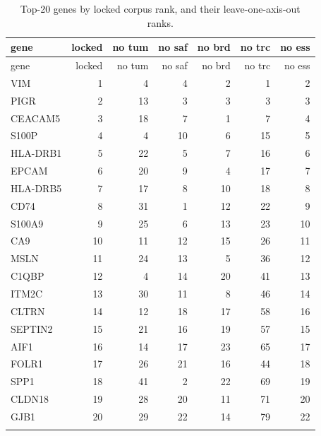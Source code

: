 \begin{longtable}{lrrrrrr}\hline\hline
gene & locked & no tum & no saf & no brd & no trc & no ess\\\hline
\endfirsthead\hline\hline gene & locked & no tum & no saf & no brd & no trc & no ess\\\hline\endhead
VIM & 1 & 4 & 4 & 2 & 1 & 2\\
PIGR & 2 & 13 & 3 & 3 & 3 & 3\\
CEACAM5 & 3 & 18 & 7 & 1 & 7 & 4\\
S100P & 4 & 4 & 10 & 6 & 15 & 5\\
HLA-DRB1 & 5 & 22 & 5 & 7 & 16 & 6\\
EPCAM & 6 & 20 & 9 & 4 & 17 & 7\\
HLA-DRB5 & 7 & 17 & 8 & 10 & 18 & 8\\
CD74 & 8 & 31 & 1 & 12 & 22 & 9\\
S100A9 & 9 & 25 & 6 & 13 & 23 & 10\\
CA9 & 10 & 11 & 12 & 15 & 26 & 11\\
MSLN & 11 & 24 & 13 & 5 & 36 & 12\\
C1QBP & 12 & 4 & 14 & 20 & 41 & 13\\
ITM2C & 13 & 30 & 11 & 8 & 46 & 14\\
CLTRN & 14 & 12 & 18 & 17 & 58 & 16\\
SEPTIN2 & 15 & 21 & 16 & 19 & 57 & 15\\
AIF1 & 16 & 14 & 17 & 23 & 65 & 17\\
FOLR1 & 17 & 26 & 21 & 16 & 44 & 18\\
SPP1 & 18 & 41 & 2 & 22 & 69 & 19\\
CLDN18 & 19 & 28 & 20 & 11 & 71 & 20\\
GJB1 & 20 & 29 & 22 & 14 & 79 & 22\\
\hline\hline\caption{Top-20 genes by locked corpus rank, and their leave-one-axis-out ranks.}\label{tab:displacement}\end{longtable}
